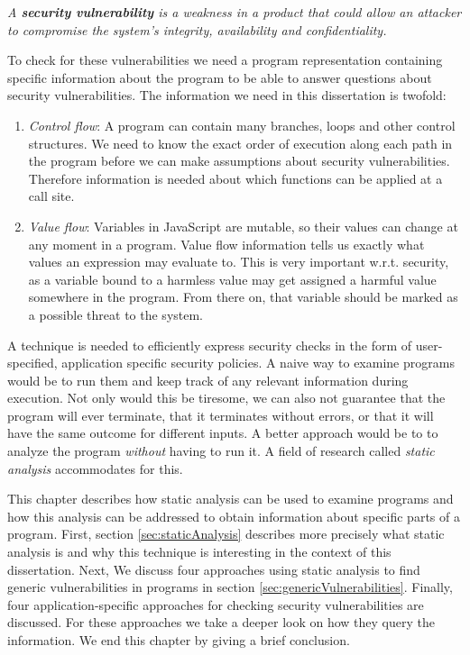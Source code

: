 \begin{definition}
\textit{A \textbf{security vulnerability} is a weakness in a product that could allow an attacker to compromise the system's integrity, availability and confidentiality.} 
\end{definition}

To check for these vulnerabilities we need a program representation containing specific information about the program to be able to answer questions about security vulnerabilities. The information we need in this dissertation is twofold:

\begin{enumerate}
\item \textit{Control flow}: A program can contain many branches, loops and other control structures. We need to know the exact order of execution along each path in the program before we can make assumptions about security vulnerabilities. Therefore information is needed about which functions can be applied at a call site.
\item \textit{Value flow}: Variables in JavaScript are mutable, so their values can change at any moment in a program. Value flow information tells us exactly what values an expression may evaluate to. This is very important w.r.t. security, as a variable bound to a harmless value may get assigned a harmful value somewhere in the program. From there on, that variable should be marked as a possible threat to the system.
\end{enumerate}

A technique is needed to efficiently express security checks in the form of user-specified, application specific security policies. A naive way to examine programs would be to run them and keep track of any relevant information during execution. Not only would this be tiresome, we can also not guarantee that the program will ever terminate, that it terminates without errors, or that it will have the same outcome for different inputs. A better approach would be to to analyze the program \textit{without} having to run it. A field of research called \textit{static analysis} accommodates for this.

This chapter describes how static analysis can be used to examine programs and how this analysis can be addressed to obtain information about specific parts of a program. First, section \ref{sec:staticAnalysis} describes more precisely what static analysis is and why this technique is interesting in the context of this dissertation. Next, We discuss four approaches using static analysis to find generic vulnerabilities in programs in section \ref{sec:genericVulnerabilities}. Finally, four application-specific approaches for checking security vulnerabilities are discussed. For these approaches we take a deeper look on how they query the information. We end this chapter by giving a brief conclusion.

